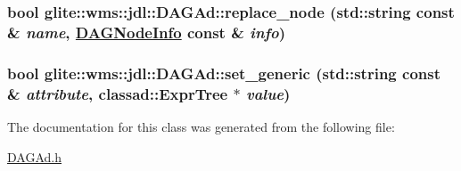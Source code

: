 \hypertarget{classglite_1_1wms_1_1jdl_1_1DAGAd_a10}{
\subsubsection[replace\_\-node]{\setlength{\rightskip}{0pt plus 5cm}bool glite::wms::jdl::DAGAd::replace\_\-node (std::string const \& {\em name}, \hyperlink{classglite_1_1wms_1_1jdl_1_1DAGNodeInfo}{DAGNode\-Info} const \& {\em info})}}
\label{classglite_1_1wms_1_1jdl_1_1DAGAd_a10}


\hypertarget{classglite_1_1wms_1_1jdl_1_1DAGAd_a17}{
\subsubsection[set\_\-generic]{\setlength{\rightskip}{0pt plus 5cm}bool glite::wms::jdl::DAGAd::set\_\-generic (std::string const \& {\em attribute}, classad::Expr\-Tree $\ast$ {\em value})}}
\label{classglite_1_1wms_1_1jdl_1_1DAGAd_a17}




The documentation for this class was generated from the following file:\begin{CompactItemize}
\item 
\hyperlink{DAGAd_8h}{DAGAd.h}\end{CompactItemize}
